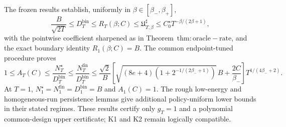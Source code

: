 The frozen results establish, uniformly in \(\beta\in[\beta_-,\beta_+]\), \[\frac{B}{\sqrt{2T}}\le D_T^{\mathrm{bin}}\le R_T(\beta;C)\le\mathfrak U_{T,\beta}^{\sharp}\le C_0^\star T^{-\beta/(2\beta+1)},\] with the pointwise coefficient sharpened as in Theorem~\(\mathrm{thm:oracle-rate}\), and the exact boundary identity \(R_1(\beta;C)=B\). The common endpoint-tuned procedure proves \[1\le A_T(C)\le\frac{N_T^\star}{D_T^{\mathrm{bin}}}\le\frac{N_T^{\mathrm{fin}}}{D_T^{\mathrm{bin}}}\le\frac{\sqrt2}{B}\left[\sqrt{(8e+4)\left(1+2^{-1/(2\beta_-+1)}\right)}\,B+\frac{2C}{\beta_-}\right]T^{1/(4\beta_-+2)}.\] At \(T=1\), \(N_1^\star=N_1^{\mathrm{fin}}=D_1^{\mathrm{bin}}=B\) and \(A_1(C)=1\). The rough low-energy and homogeneous-run persistence lemmas give additional policy-uniform lower bounds in their stated regimes. These results certify only \(g_T=1\) and a polynomial common-design upper certificate; K1 and K2 remain logically compatible.